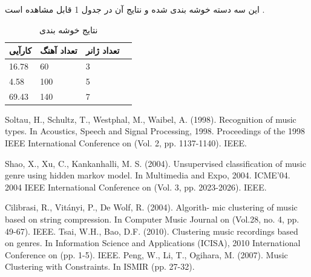 \documentclass[conference]{IEEEtran}
\begin{document}
این سه دسته خوشه بندی شده و نتایج آن در جدول 1 قابل مشاهده است .
\begin{table}[]
        \centering
    \begin{tabular}{|l|l|l|l|}
    \hline
    کارآیی & تعداد آهنگ  & تعداد ژانر  \\ \hline
    16.78 & 60 & 3 \\ \hline
4.58 & 100 & 5 \\ \hline
69.43 & 140 & 7 \\ \hline
    \end{tabular}
    \caption{نتایج خوشه بندی}
    \label{tab:my_label}
\end{table}


\begin{thebibliography}{99}
\begin{LTRbibitems}

Soltau, H., Schultz, T., Westphal, M., Waibel, A. (1998).
Recognition of music types. In Acoustics, Speech and
Signal Processing, 1998. Proceedings of the 1998 IEEE
International Conference on (Vol. 2, pp. 1137-1140).
IEEE.

Shao, X., Xu, C., Kankanhalli, M. S. (2004). Unsupervised
classification of music genre using hidden markov model.
In Multimedia and Expo, 2004. ICME’04. 2004 IEEE
International Conference on (Vol. 3, pp. 2023-2026).
IEEE.

Cilibrasi, R., Vitányi, P., De Wolf, R. (2004). Algorith-
mic clustering of music based on string compression. In
Computer Music Journal on (Vol.28, no. 4, pp. 49-67).
IEEE.
Tsai, W.H., Bao, D.F. (2010). Clustering music recordings
based on genres. In Information Science and Applications
(ICISA), 2010 International Conference on (pp. 1-5).
IEEE.
Peng, W., Li, T., Ogihara, M. (2007). Music Clustering
with Constraints. In ISMIR (pp. 27-32).


\end{LTRbibitems}
\end{thebibliography}
 
    
    
\end{document}
